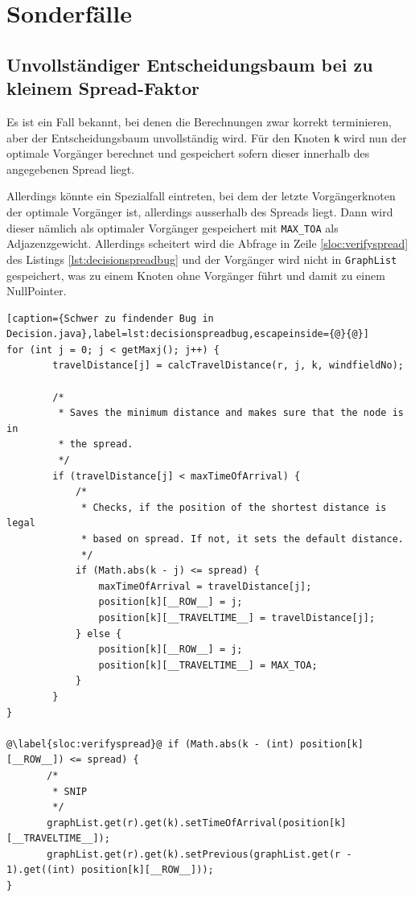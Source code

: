 \section{Sonderfälle}
\subsection{Unvollständiger Entscheidungsbaum bei zu kleinem Spread-Faktor}
Es ist ein Fall bekannt, bei denen die Berechnungen zwar korrekt terminieren,
aber der Entscheidungsbaum unvollständig wird. Für den Knoten \texttt{k} wird
nun der optimale Vorgänger berechnet und gespeichert sofern dieser innerhalb
des angegebenen Spread liegt.

Allerdings könnte ein Spezialfall eintreten, bei dem der letzte
Vorgängerknoten der optimale Vorgänger ist, allerdings ausserhalb des Spreads
liegt. Dann wird dieser nämlich als optimaler Vorgänger gespeichert mit
\texttt{MAX\_TOA} als Adjazenzgewicht. Allerdings scheitert wird die Abfrage
in Zeile \ref{sloc:verifyspread} des Listings \ref{lst:decisionspreadbug} und
der Vorgänger wird nicht in \texttt{GraphList} gespeichert, was zu einem
Knoten ohne Vorgänger führt und damit zu einem NullPointer.

\begin{lstlisting}[caption={Schwer zu findender Bug in
Decision.java},label=lst:decisionspreadbug,escapeinside={@}{@}]
for (int j = 0; j < getMaxj(); j++) {
        travelDistance[j] = calcTravelDistance(r, j, k, windfieldNo);
        
        /*
         * Saves the minimum distance and makes sure that the node is in
         * the spread.
         */
        if (travelDistance[j] < maxTimeOfArrival) {
        	/*
        	 * Checks, if the position of the shortest distance is legal
        	 * based on spread. If not, it sets the default distance.
        	 */
        	if (Math.abs(k - j) <= spread) {
        		maxTimeOfArrival = travelDistance[j];
        		position[k][__ROW__] = j;
        		position[k][__TRAVELTIME__] = travelDistance[j];
        	} else {
        		position[k][__ROW__] = j;
        		position[k][__TRAVELTIME__] = MAX_TOA;
        	}
        }
}

@\label{sloc:verifyspread}@ if (Math.abs(k - (int) position[k][__ROW__]) <= spread) {
       /*
        * SNIP
        */
       graphList.get(r).get(k).setTimeOfArrival(position[k][__TRAVELTIME__]);
       graphList.get(r).get(k).setPrevious(graphList.get(r - 1).get((int) position[k][__ROW__]));
}

\end{lstlisting}

